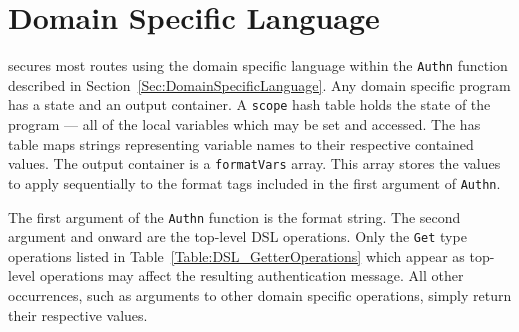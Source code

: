 


\section{Domain Specific Language}

\sys{} secures most routes using the domain specific language within the \lstinline{Authn} function described in Section~\ref{Sec:DomainSpecificLanguage}. Any domain specific program has a state and an output container. A \lstinline{scope} hash table holds the state of the program --- all of the local variables which may be set and accessed. The has table maps strings representing variable names to their respective contained values. The output container is a \lstinline{formatVars} array. This array stores the values to apply sequentially to the format tags included in the first argument of \lstinline{Authn}.



The first argument of the \lstinline{Authn} function is the format string. The second argument and onward are the top-level DSL operations. Only the \lstinline{Get} type operations listed in Table~\ref{Table:DSL_GetterOperations} which appear as top-level operations may affect the resulting authentication message. All other occurrences, such as arguments to other domain specific operations, simply return their respective values. 

